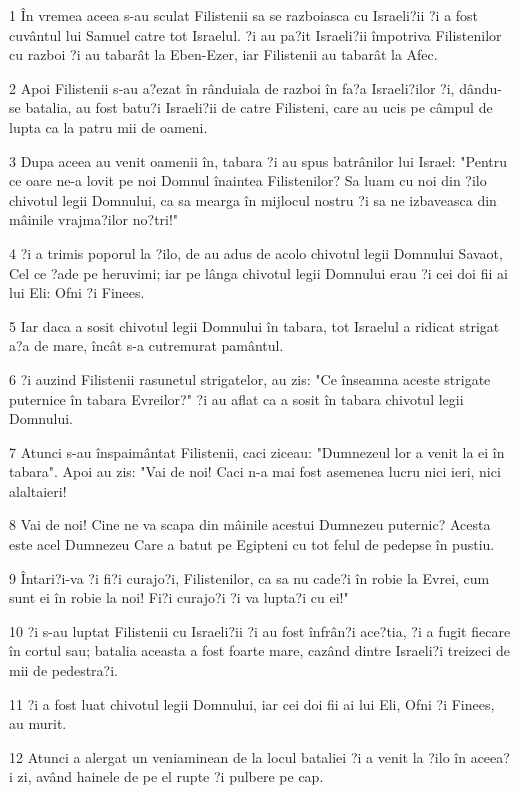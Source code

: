 \par 1 În vremea aceea s-au sculat Filistenii sa se razboiasca cu Israeli?ii ?i a fost cuvântul lui Samuel catre tot Israelul. ?i au pa?it Israeli?ii împotriva Filistenilor cu razboi ?i au tabarât la Eben-Ezer, iar Filistenii au tabarât la Afec.
\par 2 Apoi Filistenii s-au a?ezat în rânduiala de razboi în fa?a Israeli?ilor ?i, dându-se batalia, au fost batu?i Israeli?ii de catre Filisteni, care au ucis pe câmpul de lupta ca la patru mii de oameni.
\par 3 Dupa aceea au venit oamenii în, tabara ?i au spus batrânilor lui Israel: "Pentru ce oare ne-a lovit pe noi Domnul înaintea Filistenilor? Sa luam cu noi din ?ilo chivotul legii Domnului, ca sa mearga în mijlocul nostru ?i sa ne izbaveasca din mâinile vrajma?ilor no?tri!"
\par 4 ?i a trimis poporul la ?ilo, de au adus de acolo chivotul legii Domnului Savaot, Cel ce ?ade pe heruvimi; iar pe lânga chivotul legii Domnului erau ?i cei doi fii ai lui Eli: Ofni ?i Finees.
\par 5 Iar daca a sosit chivotul legii Domnului în tabara, tot Israelul a ridicat strigat a?a de mare, încât s-a cutremurat pamântul.
\par 6 ?i auzind Filistenii rasunetul strigatelor, au zis: "Ce înseamna aceste strigate puternice în tabara Evreilor?" ?i au aflat ca a sosit în tabara chivotul legii Domnului.
\par 7 Atunci s-au înspaimântat Filistenii, caci ziceau: "Dumnezeul lor a venit la ei în tabara". Apoi au zis: "Vai de noi! Caci n-a mai fost asemenea lucru nici ieri, nici alaltaieri!
\par 8 Vai de noi! Cine ne va scapa din mâinile acestui Dumnezeu puternic? Acesta este acel Dumnezeu Care a batut pe Egipteni cu tot felul de pedepse în pustiu.
\par 9 Întari?i-va ?i fi?i curajo?i, Filistenilor, ca sa nu cade?i în robie la Evrei, cum sunt ei în robie la noi! Fi?i curajo?i ?i va lupta?i cu ei!"
\par 10 ?i s-au luptat Filistenii cu Israeli?ii ?i au fost înfrân?i ace?tia, ?i a fugit fiecare în cortul sau; batalia aceasta a fost foarte mare, cazând dintre Israeli?i treizeci de mii de pedestra?i.
\par 11 ?i a fost luat chivotul legii Domnului, iar cei doi fii ai lui Eli, Ofni ?i Finees, au murit.
\par 12 Atunci a alergat un veniaminean de la locul bataliei ?i a venit la ?ilo în aceea?i zi, având hainele de pe el rupte ?i pulbere pe cap.

